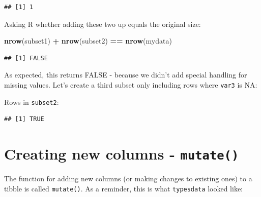 \documentclass[
  12pt,
  krantz2]{krantz}
\makeatletter
\newenvironment{Shaded}{\begin{snugshade}}{\end{snugshade}}
\newcommand{\KeywordTok}[1]{\textcolor[rgb]{0.13,0.29,0.53}{\textbf{#1}}}
\newcommand{\NormalTok}[1]{#1}
\newcommand{\OperatorTok}[1]{\textcolor[rgb]{0.81,0.36,0.00}{\textbf{#1}}}
\newcommand{\StringTok}[1]{\textcolor[rgb]{0.31,0.60,0.02}{#1}}
\newenvironment{kframe}{%
\medskip{}
\setlength{\fboxsep}{.8em}
 \def\at@end@of@kframe{}%
 \ifinner\ifhmode%
  \def\at@end@of@kframe{\end{minipage}}%
  \begin{minipage}{\columnwidth}%
 \fi\fi%
 \def\FrameCommand##1{\hskip\@totalleftmargin \hskip-\fboxsep
 \colorbox{shadecolor}{##1}\hskip-\fboxsep
     \hskip-\linewidth \hskip-\@totalleftmargin \hskip\columnwidth}%
 \MakeFramed {\advance\hsize-\width
   \@totalleftmargin\z@ \linewidth\hsize
   \@setminipage}}%
 {\par\unskip\endMakeFramed%
 \at@end@of@kframe}
\renewenvironment{Shaded}{\begin{kframe}}{\end{kframe}}
\makeatother
\begin{document}
\begin{verbatim}
## [1] 1
\end{verbatim}

Asking R whether adding these two up equals the original size:

\begin{Shaded}
\begin{Highlighting}[]
\KeywordTok{nrow}\NormalTok{(subset1) }\OperatorTok{+}\StringTok{ }\KeywordTok{nrow}\NormalTok{(subset2) }\OperatorTok{==}\StringTok{ }\KeywordTok{nrow}\NormalTok{(mydata)}
\end{Highlighting}
\end{Shaded}

\begin{verbatim}
## [1] FALSE
\end{verbatim}

As expected, this returns FALSE - because we didn't add special handling for missing values.
Let's create a third subset only including rows where \texttt{var3} is NA:

Rows in \texttt{subset2}:

\begin{Shaded}
\end{Shaded}

\begin{verbatim}
## [1] TRUE
\end{verbatim}

\hypertarget{creating-new-columns---mutate}{%
\section{\texorpdfstring{Creating new columns - \texttt{mutate()}}{Creating new columns - mutate()}}\label{creating-new-columns---mutate}}


The function for adding new columns (or making changes to existing ones) to a tibble is called \texttt{mutate()}.
As a reminder, this is what \texttt{typesdata} looked like:
\end{document}
